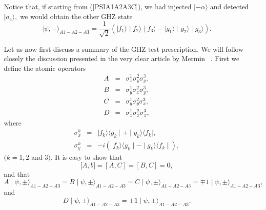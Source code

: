 \documentclass[12pt,thmsa]{article}
\begin{document}
Notice that, if starting from (\ref{PSIA1A2A3C}), we had injected $|-\alpha
\rangle $ and detected $|a_{4}\rangle ,$ we would obtain the other GHZ state 
\begin{equation}
\mid \psi ,-\rangle _{A1-A2-A3}=\frac{1}{\sqrt{2}}(\mid f_{1}\rangle \mid
f_{2}\rangle \mid f_{3}\rangle -\mid g_{1}\rangle \mid g_{2}\rangle \mid
g_{3}\rangle ).  \label{GHZ-}
\end{equation}

Let us now first discuss a summary of the GHZ test prescription. We will
follow closely the discussion presented in the very clear article by Mermin
\ \cite{Mermin}. First we define the atomic operators%
\begin{eqnarray}
A &=&\sigma _{x}^{1}\sigma _{y}^{2}\sigma _{y}^{3},  \nonumber \\
B &=&\sigma _{y}^{1}\sigma _{x}^{2}\sigma _{y}^{3},  \nonumber \\
C &=&\sigma _{y}^{1}\sigma _{y}^{2}\sigma _{x}^{3},  \nonumber \\
D &=&\sigma _{x}^{1}\sigma _{x}^{2}\sigma _{x}^{3},  \label{ABCD}
\end{eqnarray}%
where%
\begin{eqnarray}
\sigma _{x}^{k} &=&\mid f_{k}\rangle \langle g_{k}\mid +\mid g_{k}\rangle
\langle f_{k}\mid ,  \nonumber \\
\sigma _{y}^{k} &=&-i(\mid f_{k}\rangle \langle g_{k}\mid -\mid g_{k}\rangle
\langle f_{k}\mid ),
\end{eqnarray}%
$(k=1,2$ and $3)$. It is easy to show that 
\begin{equation}
\lbrack A,b]=[A,C]=[B,C]=0,
\end{equation}%
and that%
\begin{equation}
A\mid \psi ,\pm \rangle _{A1-A2-A3}=B\mid \psi ,\pm \rangle
_{A1-A2-A3}=C\mid \psi ,\pm \rangle _{A1-A2-A3}=\mp 1\mid \psi ,\pm \rangle
_{A1-A2-A3},
\end{equation}%
and%
\begin{equation}
D\mid \psi ,\pm \rangle _{A1-A2-A3}=\pm 1\mid \psi ,\pm \rangle _{A1-A2-A3}.
\label{DPSI}
\end{equation}
\end{document}
